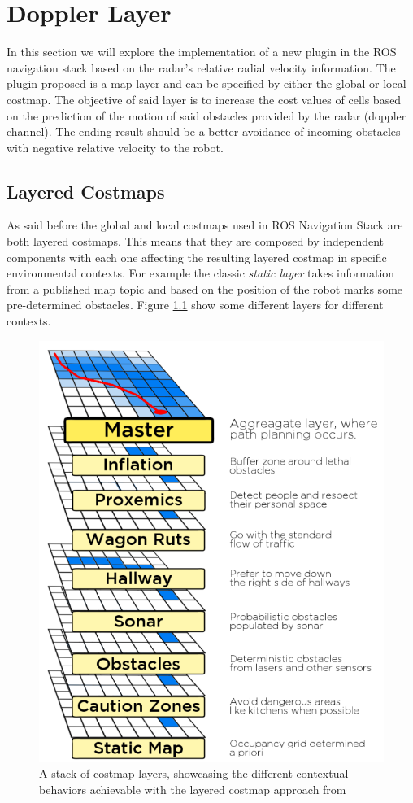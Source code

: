 \chapter{Doppler Layer}

In this section we will explore the implementation of a new plugin in the ROS navigation stack based on the radar's relative radial velocity information. The plugin proposed is a map layer and can be specified by either the global or local costmap. The objective of said layer is to increase the cost values of cells based on the prediction of the motion of said obstacles provided by the radar (doppler channel). The ending result should be a better avoidance of incoming obstacles with negative relative velocity  to the robot.

\section{Layered Costmaps}
As said before the global and local costmaps used in \ac{ROS} Navigation Stack are both layered costmaps.
This means that they are composed by independent components with each one affecting the resulting layered costmap in specific environmental contexts. For example the classic \textit{static layer} takes information from a published map topic and based on the position of the robot marks some  pre-determined obstacles.  Figure \ref{fig::layers} show some different layers for different contexts.
\begin{figure}[h] 
\centerline{\includegraphics [width=0.5 \textwidth]{imgs/chapter6/layers.png}}
\caption{A stack of costmap layers, showcasing the different contextual
behaviors achievable with the layered costmap approach from \cite{lu2014layered}}
\label{fig::layers}
\end{figure}

